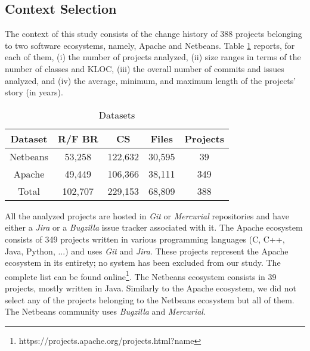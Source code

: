 
\subsection{Context Selection}

The context of this study consists of the change history of 388 projects belonging to two software ecosystems, namely, Apache and Netbeans.
Table \ref{table:datasets} reports, for each of them, (i) the number of projects analyzed, (ii) size ranges in terms of the number of classes and KLOC, (iii) the overall number of commits and issues analyzed, and (iv) the average, minimum, and maximum length of the projects' story (in years).

\begin{table}[h]
\begin{center}
\begin{tabular}{@{}c|c|c|c|c@{}}
\textbf{Dataset} & \textbf{R/F BR} & \textbf{CS} & \textbf{Files} & \textbf{Projects} \\ \hline \hline
Netbeans         & 53,258          & 122,632     & 30,595         & 39                \\
Apache           & 49,449          & 106,366     & 38,111         & 349               \\
Total            & 102,707         & 229,153     & 68,809         & 388               \\ \hline \hline

\end{tabular}
\end{center}

\caption{Datasets\label{table:datasets}}
\end{table}



All the analyzed projects are hosted in {\it Git} or {\it Mercurial} repositories and have either a {\it Jira} or a {\it Bugzilla} issue tracker associated with it.
The Apache ecosystem consists of 349 projects written in various programming languages (C, C++, Java, Python, ...) and uses {\it Git} and {\it Jira}.
These projects represent the Apache ecosystem in its entirety; no system has been excluded from our study.
The complete list can be found online\footnote{https://projects.apache.org/projects.html?name}.
The Netbeans ecosystem consists in 39 projects, mostly written in Java.
Similarly to the Apache ecosystem, we did not select any of the projects belonging to the Netbeans ecosystem but all of them.
The Netbeans community uses {\it Bugzilla} and {\it Mercurial}.

